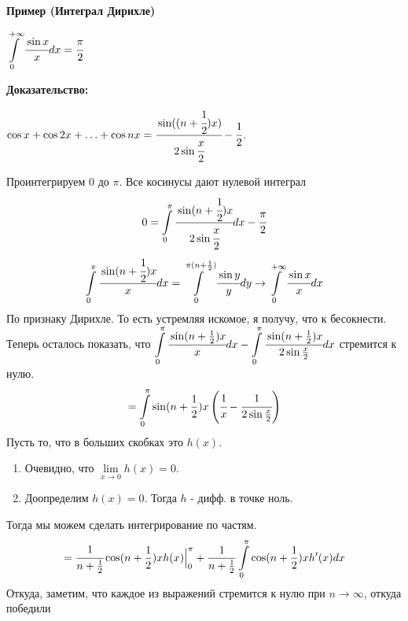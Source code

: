 \textbf{Пример (Интеграл Дирихле)}

$\displaystyle\int\limits_{0}^{+\infty}\cfrac{\sin x}{x}dx  =\cfrac{\pi}{2}$

\textbf{Доказательство:}

$\cos x + \cos 2x + \ldots + \cos nx = \cfrac{\sin ((n+\cfrac{1}{2})x)}{2\sin \cfrac{x}{2}}-\cfrac{1}{2}$.

Проинтегрируем $0$ до $\pi$. Все косинусы дают нулевой интеграл
$$0=\displaystyle\int\limits_{0}^{\pi}\cfrac{\sin (n+\cfrac{1}{2})x}{2\sin\cfrac{x}{2}}dx - \cfrac{\pi}{2}$$
$$\displaystyle\int\limits_{0}^{\pi}\cfrac{\sin (n+\cfrac{1}{2})x}{x}dx = \displaystyle\int\limits_{0}^{\pi(n+\frac{1}{2})}\cfrac{\sin y}{y}dy \rightarrow \displaystyle\int\limits_{0}^{+\infty}\cfrac{\sin x}{x}dx$$
По признаку Дирихле. То есть устремляя искомое, я получу, что к бесокнести. Теперь осталось показать, что $\displaystyle\int\limits_{0}^{\pi} \cfrac{\sin (n+ \frac{1}{2} )x}{x}dx - \displaystyle\int\limits_{0}^{\pi}\cfrac{\sin(n+\frac{1}{2})x}{2\sin \frac{x}{2}}dx$ стремится к нулю.
$$=\displaystyle\int\limits_{0}^{\pi}\sin (n + \frac{1}{2})x \left( \cfrac{1}{x} - \cfrac{1}{2 \sin \frac{x}{2}}\right)$$
Пусть то, что в больших скобках это $h(x)$. 
\begin{enumerate}
    \item Очевидно, что $\lim\limits_{x\rightarrow0}h(x) = 0$. 
    \item Доопределим $h(x) = 0$. Тогда $h$ - дифф. в точке ноль.
\end{enumerate}
Тогда мы можем сделать интегрирование по частям.
$$=\cfrac{1}{n + \frac{1}{2}}\cos (n + \frac{1}{2})x h(x) \Big|^\pi_0 + \frac{1}{n + \frac{1}{2}}\displaystyle\int\limits_{0}^{\pi}\cos (n + \frac{1}{2})x h'(x) dx$$
Откуда, заметим, что каждое из выражений стремится к нулю при $n\rightarrow \infty$, откуда победили